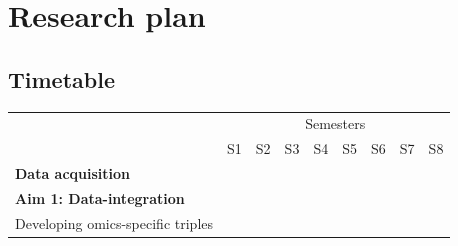 \documentclass[twoside,fontsize=10pt]{article}
\begin{document}
\section*{Research plan}
\subsection*{Timetable}
\begin{table}[h]
\begin{center}
\begin{tabular}{lllllllll}
                                                & \multicolumn{8}{c}{Semesters}                                                                                                                                                                                                                                                                                                                                                                                 \\ \cline{2-9} 
                                                & S1                                              & S2                                              & S3                                              & S4                                              & S5                                              & S6                                              & S7                                              & S8                                              \\ \hline
\textbf{Data acquisition}                       & \cellcolor[HTML]{343434}{\color[HTML]{656565} } & \cellcolor[HTML]{343434}{\color[HTML]{656565} } & \cellcolor[HTML]{343434}{\color[HTML]{656565} } & \cellcolor[HTML]{343434}{\color[HTML]{656565} } & \cellcolor[HTML]{343434}{\color[HTML]{656565} } & \cellcolor[HTML]{343434}{\color[HTML]{656565} } & \cellcolor[HTML]{343434}{\color[HTML]{656565} } & \cellcolor[HTML]{343434}{\color[HTML]{656565} } \\
\textbf{Aim 1: Data-integration}                & \cellcolor[HTML]{343434}                        & \cellcolor[HTML]{343434}                        & \cellcolor[HTML]{343434}                        &                                                 &                                                 &                                                 &                                                 &                                                 \\
\hspace*{1em} Developing omics-specific triples & \cellcolor[HTML]{656565}                        &                                                 &                                                 &                                                 &                                                 &                                                 &                                                 &                                                 \\

\end{tabular}
\end{center}
\end{table}
\end{document}
